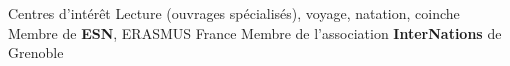 \begin{rubric}{Centres d’intérêt}
\entry*[Loisirs] 
Lecture (ouvrages spécialisés), voyage, natation, coinche %
\entry*[Activités] 
Membre de \textbf{ESN}, ERASMUS France
\entry*[]
Membre de l'association \textbf{InterNations} de Grenoble
\end{rubric}

